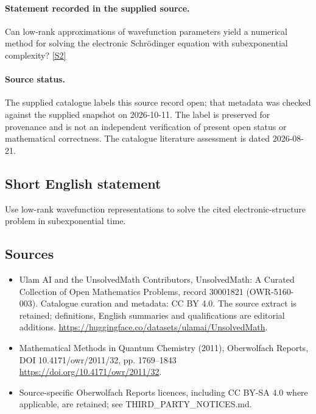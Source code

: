 \documentclass[11pt]{article}
\begin{document}
\paragraph{Statement recorded in the supplied source.}
Can low-rank approximations of wavefunction parameters yield a numerical method for solving the electronic Schrödinger equation with subexponential complexity? \href{https://doi.org/10.4171/owr/2011/32}{[S2]}
\paragraph{Source status.}
The supplied catalogue labels this source record open; that metadata was checked against the supplied snapshot on 2026-10-11. The label is preserved for provenance and is not an independent verification of present open status or mathematical correctness. The catalogue literature assessment is dated 2026-08-21.
\subsection{Short English statement}
Use low-rank wavefunction representations to solve the cited electronic-structure problem in subexponential time.
\subsection{Sources}
\begin{itemize}
\item[S1] Ulam AI and the UnsolvedMath Contributors, UnsolvedMath: A Curated Collection of Open Mathematics Problems, record 30001821 (OWR-5160-003). Catalogue curation and metadata: CC BY 4.0. The source extract is retained; definitions, English summaries and qualifications are editorial additions.
\url{https://huggingface.co/datasets/ulamai/UnsolvedMath}.
\item[S2] Mathematical Methods in Quantum Chemistry (2011), Oberwolfach Reports, DOI 10.4171/owr/2011/32, pp. 1769--1843
\url{https://doi.org/10.4171/owr/2011/32}.
\item Source-specific Oberwolfach Reports licences, including CC BY-SA 4.0 where applicable, are retained; see THIRD\_PARTY\_NOTICES.md.
\end{itemize}
\end{document}
